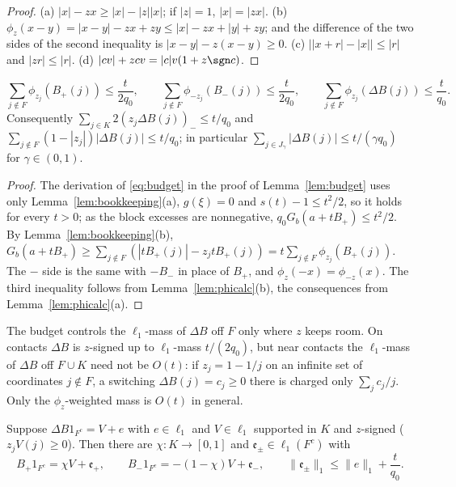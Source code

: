 \begin{proof}
(a) $|x|-zx\ge|x|-|z||x|$; if $|z|=1$, $|x|=|zx|$.  (b) $\phi_z(x-y)=
|x-y|-zx+zy\le|x|-zx+|y|+zy$; and the difference of the two sides of the
second inequality is $|x-y|-z(x-y)\ge0$.  (c) $\big||x+r|-|x|\big|\le|r|$
and $|zr|\le|r|$.  (d) $|cv|+zcv=|c|v(1+z\sgn c)$.
\end{proof}

\begin{lemma}\label{lem:switchbudget}
\[
 \sum_{j\notin F}\phi_{z_j}(B_+(j))\le\frac t{2q_0},\qquad
 \sum_{j\notin F}\phi_{-z_j}(B_-(j))\le\frac t{2q_0},\qquad
 \sum_{j\notin F}\phi_{z_j}(\Delta B(j))\le\frac t{q_0}.
\]
Consequently $\sum_{j\in K}2(z_j\Delta B(j))_-\le t/q_0$ and
$\sum_{j\notin F}(1-|z_j|)|\Delta B(j)|\le t/q_0$; in particular
$\sum_{j\in J_\gamma}|\Delta B(j)|\le t/(\gamma q_0)$ for $\gamma\in(0,1)$.
\end{lemma}

\begin{proof}
The derivation of \eqref{eq:budget} in the proof of
Lemma~\ref{lem:budget} uses only Lemma~\ref{lem:bookkeeping}(a),
$g(\xi)=0$ and $s(t)-1\le t^2/2$, so it holds for every $t>0$; as the
block excesses are nonnegative, $q_0G_b(a+tB_+)\le t^2/2$.  By
Lemma~\ref{lem:bookkeeping}(b), $G_b(a+tB_+)\ge\sum_{j\notin F}
(|tB_+(j)|-z_jtB_+(j))=t\sum_{j\notin F}\phi_{z_j}(B_+(j))$.  The $-$ side
is the same with $-B_-$ in place of $B_+$, and $\phi_z(-x)=\phi_{-z}(x)$.
The third inequality follows from Lemma~\ref{lem:phicalc}(b), the
consequences from Lemma~\ref{lem:phicalc}(a).
\end{proof}

\begin{remark}\label{rem:budgetgloss}
The budget controls the $\ell_1$-mass of $\Delta B$ off $F$ only where
$z$ keeps room.  On contacts $\Delta B$ is $z$-signed up to $\ell_1$-mass
$t/(2q_0)$, but near contacts the $\ell_1$-mass of $\Delta B$ off $F\cup K$
need not be $O(t)$: if $z_j=1-1/j$ on an infinite set of coordinates
$j\notin F$, a switching $\Delta B(j)=c_j\ge0$ there is charged only
$\sum_jc_j/j$.  Only the $\phi_{z}$-weighted mass is $O(t)$ in general.
\end{remark}

\begin{lemma}\label{lem:split}
Suppose $\Delta B1_{F^c}=V+e$ with $e\in\ell_1$ and $V\in\ell_1$ supported
in $K$ and $z$-signed \textup{(}$z_jV(j)\ge0$\textup{)}.  Then there are
$\chi:K\to[0,1]$ and $\mathfrak e_\pm\in\ell_1(F^c)$ with
\[
 B_+1_{F^c}=\chi V+\mathfrak e_+,\qquad B_-1_{F^c}=-(1-\chi)V+\mathfrak e_-,
 \qquad\|\mathfrak e_\pm\|_1\le\|e\|_1+\frac t{q_0}.
\]
\end{lemma}

